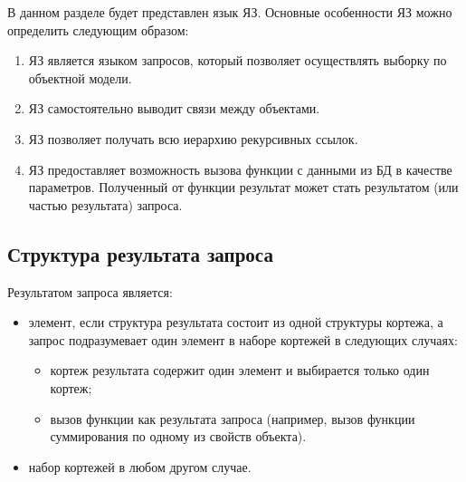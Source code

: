 В данном разделе будет представлен язык ЯЗ.
Основные особенности ЯЗ можно определить следующим образом:
\begin{enumerate}
\renewcommand{\labelenumi}{\theenumi.}
\renewcommand{\theenumi}{F\arabic{enumi}}


    \item ЯЗ является языком запросов, который позволяет осуществлять выборку по объектной 
    модели. %
    \item\label{cut_query} ЯЗ самостоятельно выводит связи между объектами. 
%	

    \item ЯЗ позволяет получать всю иерархию рекурсивных ссылок.
    \item ЯЗ предоставляет возможность вызова функции с данными из БД в качестве параметров. 
	Полученный от функции результат может стать результатом (или частью результата) запроса. 

\end{enumerate}

\subsection{Структура результата запроса}
Результатом запроса является:
    \begin{itemize}
	\item элемент, если структура результата состоит из одной структуры кортежа,
	    а запрос подразумевает один элемент в наборе кортежей в следующих случаях: 
	    \begin{itemize}
		\item кортеж результата содержит один элемент и выбирается только один кортеж;
		\item вызов функции как результата запроса 
		    (например, вызов функции суммирования по одному из свойств объекта).
	    \end{itemize}
	\item набор кортежей в любом другом случае.
    \end{itemize}

